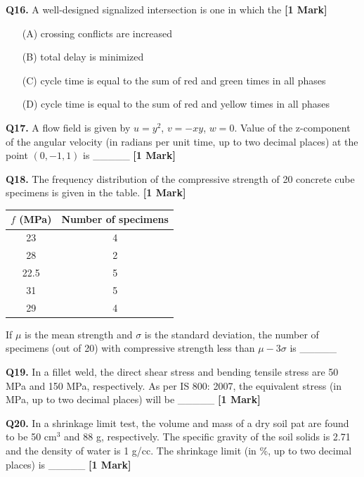 \documentclass[11pt]{article}
\newcommand{\questiona}[2]{
    \noindent\textbf{Q#2.} #1 \hfill \textbf{[1 Mark]}
}
\begin{document}
\questiona{A well-designed signalized intersection is one in which the}{16}
\begin{enumerate}
    \item[(A)] crossing conflicts are increased
    \item[(B)] total delay is minimized
    \item[(C)] cycle time is equal to the sum of red and green times in all phases
    \item[(D)] cycle time is equal to the sum of red and yellow times in all phases
\end{enumerate}
\vspace{0.5cm}

\questiona{A flow field is given by \( u = y^2 \), \( v = -xy \), \( w = 0 \). Value of the z-component of the angular velocity (in radians per unit time, up to two decimal places) at the point \((0, -1, 1)\) is \_\_\_\_\_}{17}
\vspace{0.5cm}

\questiona{The frequency distribution of the compressive strength of 20 concrete cube specimens is given in the table.}{18}

\begin{tabular}{|c|c|}
\hline
\( f \) (MPa) & Number of specimens \\
\hline
23 & 4 \\
28 & 2 \\
22.5 & 5 \\
31 & 5 \\
29 & 4 \\
\hline
\end{tabular}

If \( \mu \) is the mean strength and \( \sigma \) is the standard deviation, the number of specimens (out of 20) with compressive strength less than \( \mu - 3\sigma \) is \_\_\_\_\_
\vspace{0.5cm}

\questiona{In a fillet weld, the direct shear stress and bending tensile stress are 50 MPa and 150 MPa, respectively. As per IS 800: 2007, the equivalent stress (in MPa, up to two decimal places) will be \_\_\_\_\_}{19}
\vspace{0.5cm}

\questiona{In a shrinkage limit test, the volume and mass of a dry soil pat are found to be 50 cm\(^3\) and 88 g, respectively. The specific gravity of the soil solids is 2.71 and the density of water is 1 g/cc. The shrinkage limit (in \%, up to two decimal places) is \_\_\_\_\_}{20}
\vspace{0.5cm}
\end{document}
